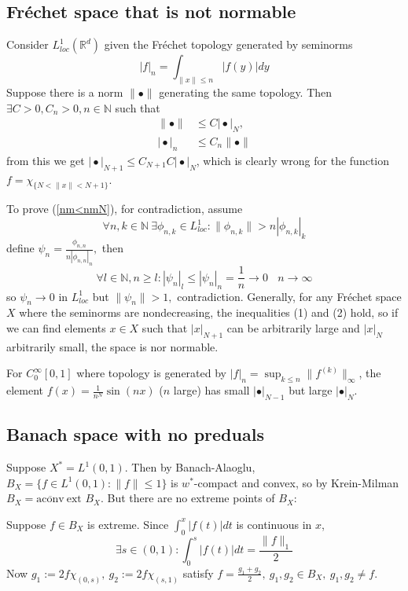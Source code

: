 \documentclass[12pt,a4paper]{article}
\newcommand\nm[1]{\lVert #1 \rVert}
\renewcommand\:{\colon}
\begin{document}
\subsection{Fréchet space that is not normable}
Consider $L^1_{loc}(\mathbb{R}^d)$ given the Fréchet topology generated by seminorms
\begin{equation*}
	|f|_n = \int_{\nm{x}\leq n}|f(y)|dy
\end{equation*}
Suppose there is a norm $\nm{\bullet}$ generating the same topology. Then $\exists C>0, C_n>0, n\in \mathbb{N}$ such that
\begin{align}
	\nm{\bullet}&\leq C|\!\bullet\!|_N, \label{nm<nmN}\\
	|\!\bullet\!|_n &\leq C_n \nm{\bullet}
\end{align}
from this we get $|\!\bullet\!|_{N+1}\leq C_{N+1}C|\!\bullet\!|_N$, which is clearly wrong for the function $f=\chi_{\{N<\nm{x}<N+1\}}.$
\par To prove (\ref{nm<nmN}), for contradiction, assume
\begin{equation*}
	\forall n,k\in \mathbb{N} \ \exists \phi_{n,k}\in L^{1}_{loc}: \nm{\phi_{n,k}}>n|\phi_{n,k}|_k
\end{equation*}
define $\psi_n = \displaystyle\frac{\phi_{n,n}}{n|\phi_{n,n}|_n},$ then 
\begin{equation*}
  \forall l\in \mathbb{N}, n\geq l: |\psi_n|_l \leq |\psi_n|_n = \frac{1}{n} \to 0 \ \ \ \ n\to \infty
\end{equation*}
so $\psi_n \to 0$ in $L^1_{loc}$ but $\nm{\psi_n}>1,$ contradiction. Generally, for any Fréchet space $X$ where the seminorms are nondecreasing, the inequalities (1) and (2) hold, so if we can find elements $x\in X$ such that $|x|_{N+1}$ can be arbitrarily large and $|x|_N$ arbitrarily small, the space is nor normable.
\par For $C^\infty_0[0,1]$ where topology is generated by $|f|_n = \sup_{k\leq n}\nm{f^{(k)}}_\infty$, the element $f(x)=\frac{1}{n^N}\sin(nx)$ ($n$ large) has small $|\bullet|_{N-1}$ but large $|\bullet|_N.$

\subsection{Banach space with no preduals}
Suppose $X^{*}=L^1(0,1).$ Then by Banach-Alaoglu, $B_X = \{f\in L^1(0,1)\: \nm{f}\leq 1\}$ is $w^{*}$-compact and convex, so by Krein-Milman $B_X=\overline{\text{aconv}}\ \text{ext } B_X$. But there are no extreme points of $B_X:$
\par Suppose $f\in B_X$ is extreme. Since $\int_0^x|f(t)|dt$ is continuous in $x$, 
\begin{equation*}
	\exists s\in (0,1): \int_0^s|f(t)|dt=\frac{\nm{f}_1}{2}
\end{equation*}
Now $g_1 := 2f\chi_{( 0,s )}, \ g_2 := 2f\chi_{(s,1)}$ satisfy $f=\displaystyle\frac{g_1+g_2}{2}, \  g_1,g_2\in B_X, \ g_1, g_2\neq f.$ 
\end{document}
